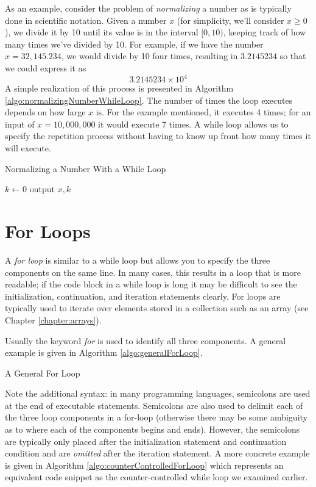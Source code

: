 As an example, consider the problem of \emph{normalizing} a number as is typically
done in scientific notation.  Given a number $x$ (for simplicity, we'll consider $x \geq 0$),
we divide it by 10 until its value is in the interval $[0, 10)$, keeping track of how many times we've 
divided by 10.  For example, if we have the number $x = 32,145.234$, we would divide
by 10 four times, resulting in $3.2145234$ so that we could express it as
  $$3.2145234 \times 10^{4}$$
A simple realization of this process is presented in Algorithm \ref{algo:normalizingNumberWhileLoop}.
The number of times the loop executes depends on how large $x$ is.  For the example
mentioned, it executes 4 times; for an input of $x = 10,000,000$ it would execute 7 times.
A while loop allows us to specify the repetition process without having to know up front
how many times it will execute.

\begin{algorithm}[H]
\caption{Normalizing a Number With a While Loop}
\label{algo:normalizingNumberWhileLoop}
$k \leftarrow 0$ \;
output $x, k$ \;
\end{algorithm}

\section{For Loops}

A \emph{for loop} is similar to a while loop but allows you to specify 
the three components on the same line.  In many cases, this results in a loop that
is more readable; if the code block in a while loop is long it may be difficult to see
the initialization, continuation, and iteration statements clearly.  For loops are 
typically used to iterate over elements stored in a collection such as an
array (see Chapter \ref{chapter:arrays}).

Usually the keyword \emph{for} is used to identify all three components.  A 
general example is given in Algorithm \ref{algo:generalForLoop}.

\begin{algorithm}[]
\caption{A General For Loop}
\label{algo:generalForLoop}
\end{algorithm}

Note the additional syntax: in many programming languages, semicolons are used
at the end of executable statements.  Semicolons are also used to delimit each of
the three loop components in a for-loop (otherwise there may be some ambiguity as
to where each of the components begins and ends).  However, the semicolons are
typically only placed after the initialization statement and continuation condition and 
are \emph{omitted} after the iteration statement.  A more concrete example is given in 
Algorithm \ref{algo:counterControlledForLoop} which represents an equivalent code
snippet as the counter-controlled while loop we examined earlier.

